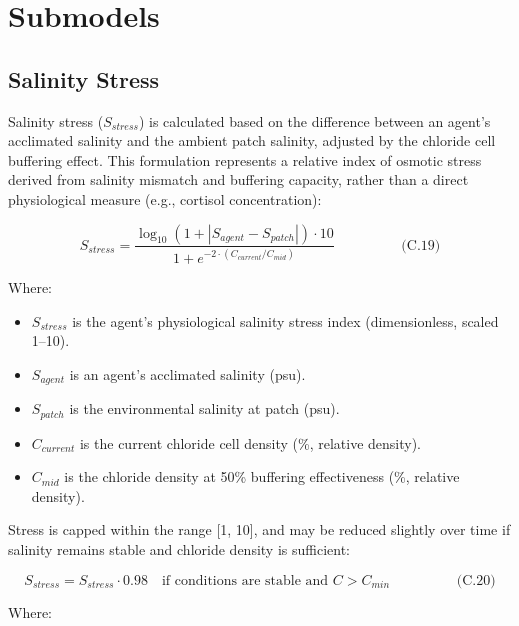 \documentclass[
]{book}
\begin{document}
\section{Submodels}\label{submodels-2}

\subsection{Salinity Stress}\label{salinity-stress}

Salinity stress (\(S_{stress}\)) is calculated based on the difference
between an agent's acclimated salinity and the ambient patch salinity,
adjusted by the chloride cell buffering effect. This formulation
represents a relative index of osmotic stress derived from salinity
mismatch and buffering capacity, rather than a direct physiological
measure (e.g., cortisol concentration):

\[
\begin{equation} S_{stress} = \frac{\log_{10}(1 + |S_{agent} - S_{patch}|) \cdot 10}{1 + e^{-2 \cdot (C_{current} / C_{mid})}}   \hspace{2cm} \text{(C.19)} \end{equation}
\]

Where:

\begin{itemize}
\item
  \(S_{stress}\) is the agent's physiological salinity stress index
  (dimensionless, scaled 1--10).
\item
  \(S_{agent}\) is an agent's acclimated salinity (psu).
\item
  \(S_{patch}\) is the environmental salinity at patch (psu).
\item
  \(C_{current}\) is the current chloride cell density (\%, relative
  density).
\item
  \(C_{mid}\) is the chloride density at 50\% buffering effectiveness (\%,
  relative density).
\end{itemize}

Stress is capped within the range {[}1, 10{]}, and may be reduced slightly
over time if salinity remains stable and chloride density is sufficient:

\[
\begin{equation} S_{stress} = S_{stress} \cdot 0.98 \quad \text{if conditions are stable and } C > C_{min}   \hspace{2cm} \text{(C.20)} \end{equation}
\]

Where:
\end{document}
